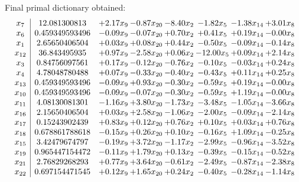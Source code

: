 \documentclass[8pt]{article}
\begin{document}
 Final primal dictionary obtained: 
\[\begin{array}{c| c c@{\hskip 2pt} c@{\hskip 2pt} c@{\hskip 2pt} c@{\hskip 2pt} c@{\hskip 2pt} c@{\hskip 2pt} }
 x_{7}   &  12.081300813 & +  2.17 x_{9} & -0.87 x_{20} & -8.40 x_{2} & -1.82 x_{5} & -1.38 x_{14} & +  3.01 x_{8}\\
 x_{6}   &  0.459349593496 & -0.09 x_{9} & -0.07 x_{20} & +  0.70 x_{2} & +  0.41 x_{5} & +  0.19 x_{14} & -0.00 x_{8}\\
 x_{1}   &  2.65650406504 & +  0.03 x_{9} & +  0.08 x_{20} & +  0.44 x_{2} & -0.50 x_{5} & -0.09 x_{14} & -0.14 x_{8}\\
 x_{12}   &  36.843495935 & +  0.97 x_{9} & -2.58 x_{20} & +  0.06 x_{2} & -12.00 x_{5} & +  0.09 x_{14} & +  2.14 x_{8}\\
 x_{3}   &  0.84756097561 & +  0.17 x_{9} & -0.12 x_{20} & -0.76 x_{2} & -0.10 x_{5} & -0.03 x_{14} & +  0.24 x_{8}\\
 x_{4}   &  4.78048780488 & +  0.07 x_{9} & -0.33 x_{20} & -0.40 x_{2} & -0.43 x_{5} & +  0.11 x_{14} & +  0.25 x_{8}\\
 x_{13}   &  0.459349593496 & -0.09 x_{9} & +  0.93 x_{20} & -0.30 x_{2} & -0.59 x_{5} & +  0.19 x_{14} & -0.00 x_{8}\\
 x_{10}   &  0.459349593496 & -0.09 x_{9} & -0.07 x_{20} & -0.30 x_{2} & -0.59 x_{5} & +  1.19 x_{14} & -0.00 x_{8}\\
 x_{11}   &  4.08130081301 & -1.16 x_{9} & +  3.80 x_{20} & -1.73 x_{2} & -3.48 x_{5} & -1.05 x_{14} & -3.66 x_{8}\\
 x_{16}   &  2.15650406504 & +  0.03 x_{9} & +  2.58 x_{20} & -1.06 x_{2} & -2.00 x_{5} & -0.09 x_{14} & -2.14 x_{8}\\
 x_{17}   &  0.15243902439 & +  0.83 x_{9} & +  0.12 x_{20} & +  0.76 x_{2} & +  0.10 x_{5} & +  0.03 x_{14} & +  0.76 x_{8}\\
 x_{18}   &  0.678861788618 & -0.15 x_{9} & +  0.26 x_{20} & +  0.10 x_{2} & -0.16 x_{5} & +  1.09 x_{14} & -0.25 x_{8}\\
 x_{15}   &  3.42479674797 & -0.19 x_{9} & +  3.72 x_{20} & -1.17 x_{2} & -2.99 x_{5} & -0.96 x_{14} & -3.52 x_{8}\\
 x_{19}   &  0.965447154472 & -0.11 x_{9} & +  1.79 x_{20} & +  0.13 x_{2} & -0.39 x_{5} & -0.15 x_{14} & -0.52 x_{8}\\
 x_{21}   &  2.76829268293 & +  0.77 x_{9} & +  3.64 x_{20} & -0.61 x_{2} & -2.49 x_{5} & -0.87 x_{14} & -2.38 x_{8}\\
 x_{22}   &  0.697154471545 & +  0.12 x_{9} & +  1.65 x_{20} & +  0.24 x_{2} & -0.40 x_{5} & -0.28 x_{14} & -1.14 x_{8}\\

\end{array}\]
\end{document}
